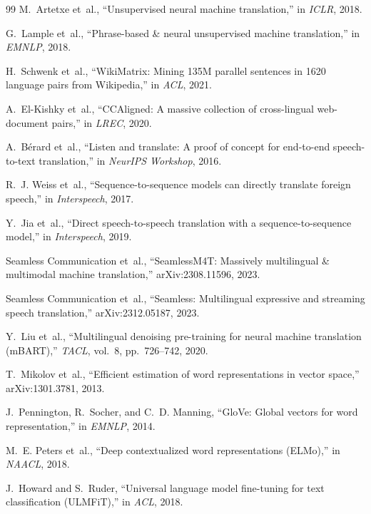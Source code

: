 \begin{thebibliography}{99}
M.~Artetxe et~al., ``Unsupervised neural machine translation,'' in \emph{ICLR},
2018.

G.~Lample et~al., ``Phrase-based \& neural unsupervised machine translation,''
in \emph{EMNLP}, 2018.

H.~Schwenk et~al., ``WikiMatrix: Mining 135M parallel sentences in 1620 language
pairs from Wikipedia,'' in \emph{ACL}, 2021.

A.~El-Kishky et~al., ``CCAligned: A massive collection of cross-lingual
web-document pairs,'' in \emph{LREC}, 2020.

A.~B\'erard et~al., ``Listen and translate: A proof of concept for end-to-end
speech-to-text translation,'' in \emph{NeurIPS Workshop}, 2016.

R.~J. Weiss et~al., ``Sequence-to-sequence models can directly translate foreign
speech,'' in \emph{Interspeech}, 2017.

Y.~Jia et~al., ``Direct speech-to-speech translation with a sequence-to-sequence
model,'' in \emph{Interspeech}, 2019.

Seamless Communication et~al., ``SeamlessM4T: Massively multilingual \&
multimodal machine translation,'' arXiv:2308.11596, 2023.

Seamless Communication et~al., ``Seamless: Multilingual expressive and streaming
speech translation,'' arXiv:2312.05187, 2023.

Y.~Liu et~al., ``Multilingual denoising pre-training for neural machine
translation (mBART),'' \emph{TACL}, vol.~8, pp.~726--742, 2020.

T.~Mikolov et~al., ``Efficient estimation of word representations in vector
space,'' arXiv:1301.3781, 2013.

J.~Pennington, R.~Socher, and C.~D. Manning, ``GloVe: Global vectors for word
representation,'' in \emph{EMNLP}, 2014.

M.~E. Peters et~al., ``Deep contextualized word representations (ELMo),'' in
\emph{NAACL}, 2018.

J.~Howard and S.~Ruder, ``Universal language model fine-tuning for text
classification (ULMFiT),'' in \emph{ACL}, 2018.


\end{thebibliography}
